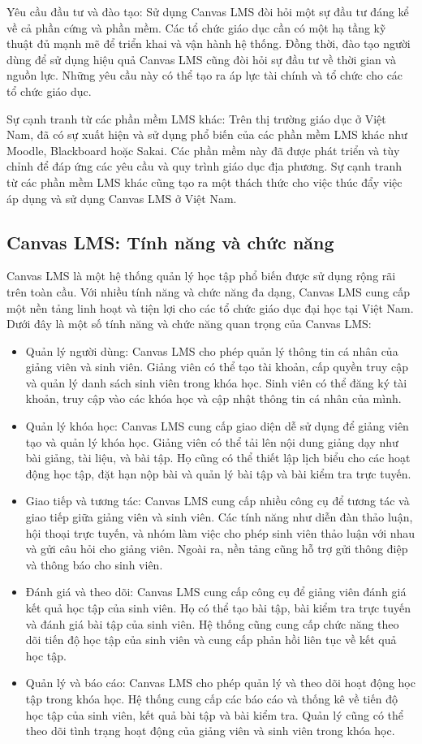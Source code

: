 \documentclass[../Thesis.tex]{subfiles}
\begin{document}
			Yêu cầu đầu tư và đào tạo: Sử dụng Canvas LMS đòi hỏi một sự đầu tư đáng kể về cả phần cứng và phần mềm. Các tổ chức giáo dục cần có một hạ tầng kỹ thuật đủ mạnh mẽ để triển khai và vận hành hệ thống. Đồng thời, đào tạo người dùng để sử dụng hiệu quả Canvas LMS cũng đòi hỏi sự đầu tư về thời gian và nguồn lực. Những yêu cầu này có thể tạo ra áp lực tài chính và tổ chức cho các tổ chức giáo dục.

			Sự cạnh tranh từ các phần mềm LMS khác: Trên thị trường giáo dục ở Việt Nam, đã có sự xuất hiện và sử dụng phổ biến của các phần mềm LMS khác như Moodle, Blackboard hoặc Sakai. Các phần mềm này đã được phát triển và tùy chỉnh để đáp ứng các yêu cầu và quy trình giáo dục địa phương. Sự cạnh tranh từ các phần mềm LMS khác cũng tạo ra một thách thức cho việc thúc đẩy việc áp dụng và sử dụng Canvas LMS ở Việt Nam.
	\subsection{Canvas LMS: Tính năng và chức năng}
	Canvas LMS là một hệ thống quản lý học tập phổ biến được sử dụng rộng rãi trên toàn cầu. Với nhiều tính năng và chức năng đa dạng, Canvas LMS cung cấp một nền tảng linh hoạt và tiện lợi cho các tổ chức giáo dục đại học tại Việt Nam. Dưới đây là một số tính năng và chức năng quan trọng của Canvas LMS:

	\begin{itemize}
		\item Quản lý người dùng: Canvas LMS cho phép quản lý thông tin cá nhân của giảng viên và sinh viên. Giảng viên có thể tạo tài khoản, cấp quyền truy cập và quản lý danh sách sinh viên trong khóa học. Sinh viên có thể đăng ký tài khoản, truy cập vào các khóa học và cập nhật thông tin cá nhân của mình.
		\item Quản lý khóa học: Canvas LMS cung cấp giao diện dễ sử dụng để giảng viên tạo và quản lý khóa học. Giảng viên có thể tải lên nội dung giảng dạy như bài giảng, tài liệu, và bài tập. Họ cũng có thể thiết lập lịch biểu cho các hoạt động học tập, đặt hạn nộp bài và quản lý bài tập và bài kiểm tra trực tuyến.
		\item Giao tiếp và tương tác: Canvas LMS cung cấp nhiều công cụ để tương tác và giao tiếp giữa giảng viên và sinh viên. Các tính năng như diễn đàn thảo luận, hội thoại trực tuyến, và nhóm làm việc cho phép sinh viên thảo luận với nhau và gửi câu hỏi cho giảng viên. Ngoài ra, nền tảng cũng hỗ trợ gửi thông điệp và thông báo cho sinh viên.
		\item Đánh giá và theo dõi: Canvas LMS cung cấp công cụ để giảng viên đánh giá kết quả học tập của sinh viên. Họ có thể tạo bài tập, bài kiểm tra trực tuyến và đánh giá bài tập của sinh viên. Hệ thống cũng cung cấp chức năng theo dõi tiến độ học tập của sinh viên và cung cấp phản hồi liên tục về kết quả học tập.
		\item Quản lý và báo cáo: Canvas LMS cho phép quản lý và theo dõi hoạt động học tập trong khóa học. Hệ thống cung cấp các báo cáo và thống kê về tiến độ học tập của sinh viên, kết quả bài tập và bài kiểm tra. Quản lý cũng có thể theo dõi tình trạng hoạt động của giảng viên và sinh viên trong khóa học.
	\end{itemize}
\end{document}
